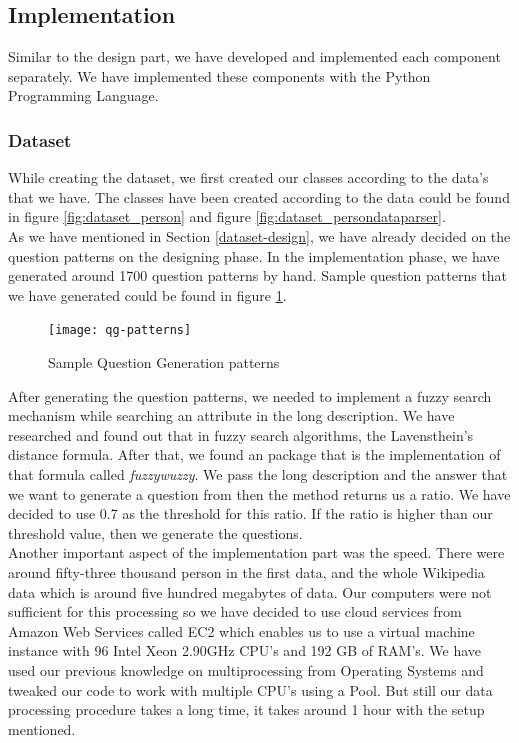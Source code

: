 \documentclass{mefsdp}
\begin{document}
	\subsection{Implementation}
	Similar to the design part, we have developed and implemented each component separately. We have implemented these components with the Python Programming Language.
	\subsubsection{Dataset}
	While creating the dataset, we first created our classes according to the data's that we have. The classes have been created according to the data could be found in figure \ref{fig:dataset_person} and figure \ref{fig:dataset_persondataparser}.\\
	
	As we have mentioned in Section \ref{dataset-design}, we have already decided on the question patterns on the designing phase. In the implementation phase, we have generated around 1700 question patterns by hand. Sample question patterns that we have generated could be found in figure \ref{qg-patterns}.
	\begin{figure}[h!]
		\centering
		\texttt{[image: qg-patterns]}
		\caption{Sample Question Generation patterns\label{qg-patterns}}
	\end{figure}
	After generating the question patterns, we needed to implement a fuzzy search mechanism while searching an attribute in the long description. We have researched and found out that in fuzzy search algorithms, the Lavensthein’s distance formula. After that, we found an package that is the implementation of that formula called \textit{fuzzywuzzy}. We pass the long description and the answer that we want to generate a question from then the method returns us a ratio. We have decided to use 0.7 as the threshold for this ratio. If the ratio is higher than our threshold value, then we generate the questions.\\
	
	Another important aspect of the implementation part was the speed. There were around fifty-three thousand person in the first data, and the whole Wikipedia data which is around five hundred megabytes of data.  Our computers were not sufficient for this processing so we have decided to use cloud services from Amazon Web Services called EC2 which enables us to use a virtual machine instance with 96 Intel Xeon 2.90GHz CPU’s and 192 GB of RAM’s. We have used our previous knowledge on multiprocessing from Operating Systems and tweaked our code to work with multiple CPU’s using a Pool. But still our data processing procedure takes a long time, it takes around 1 hour with the setup mentioned. 
	
\end{document}
